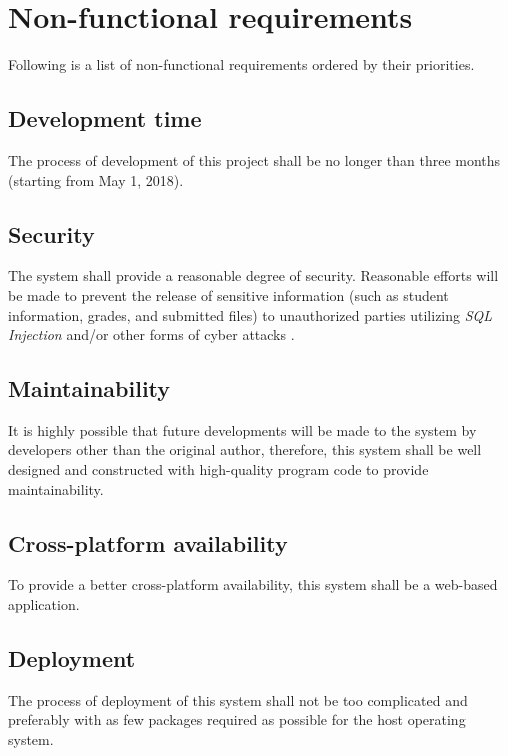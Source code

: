 \pagebreak

\section{Non-functional requirements}
Following is a list of non-functional requirements ordered by their priorities.

\subsection{Development time}
\label{TIMEFRAME}
The process of development of this project shall be no longer than three
months (starting from May 1, 2018).

\subsection{Security}
\label{SECURITY}
The system shall provide a reasonable degree of security.
Reasonable efforts will be made to prevent the release of 
sensitive information (such as student information, grades, and
submitted files) to unauthorized parties utilizing \emph{SQL Injection} 
and/or other forms of cyber attacks \cite{cyberAttacks}.

\subsection{Maintainability}
\label{MAINTAINABILITY}
It is highly possible that future developments will be made to the system by
developers other than the original author, therefore, this system shall be
well designed and constructed with high-quality program code to provide
maintainability.

\subsection{Cross-platform availability}
To provide a better cross-platform availability, this system shall be a
web-based application.

\subsection{Deployment}
The process of deployment of this system shall not be too complicated and
preferably with as few packages required as possible for the host operating
system.
